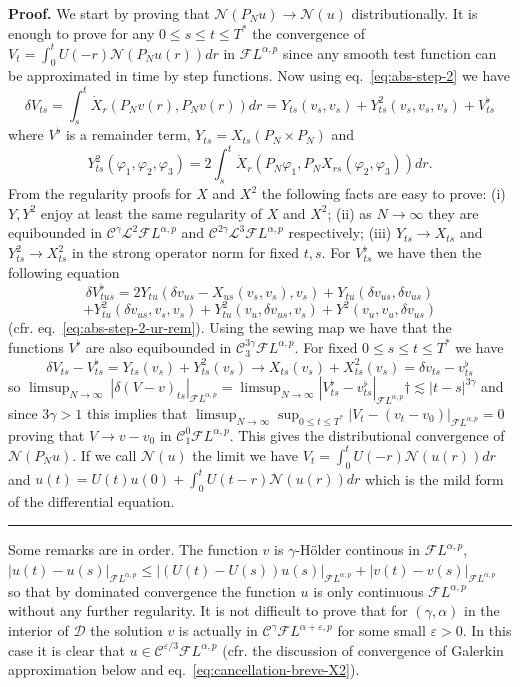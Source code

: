\documentclass[a4paper,11pt,reqno]{article}
\newcommand{\eps}{\varepsilon}
\newcommand{\der}{\delta}
\newcommand{\CC}{\mathcal{C}}
\newcommand{\DD}{\mathcal{D}}
\newcommand{\FF}{\mathcal{F}}
\newcommand{\LL}{\mathcal{L}}
\newenvironment{proof}[1][Proof]{\textbf{#1.} }{\ \rule{0.5em}{0.5em}}
\begin{document}
\begin{proof}
We start by proving that $\mathcal{N}(P_N u) \to \mathcal{N}(u)$ distributionally. It is enough to prove for any $0\le s \le t \le T^*$ the convergence of 
$
V_{t}=\int_0^t  U(-r)\mathcal{N}(P_N u(r)) dr 
$
in $\FF L^{\alpha,p}$ since any smooth test function can be approximated in time by step functions. Now using eq.~\eqref{eq:abs-step-2} we have
\begin{equation}
\label{eq:weak-conv-decomp}
\der V_{ts}=
\int_s^t \dot X_r(P_N v(r),P_N v(r)) dr
=Y_{ts}(v_s,v_s)+Y^2_{ts}(v_s,v_s,v_s) + V^\flat_{ts}
\end{equation}
where $V^\flat$ is a remainder term, $Y_{ts} = X_{ts}(P_N \times P_N)$ and
$$
Y^2_{ts}(\varphi_1,\varphi_2,\varphi_3) = 2 \int_s^t \dot X_r(P_N \varphi_1,P_N X_{rs}(\varphi_2,\varphi_3)) dr .
$$
From the regularity proofs for $X$ and $X^2$ the following facts are easy to prove:
 (i)
 $Y, Y^2$ enjoy at least the same regularity of $X$ and $ X^2$; (ii)
as $N\to \infty$ they are equibounded in $\CC^\gamma \LL^2 \FF L^{\alpha,p}$ and $\CC^{2\gamma} \LL^3 \FF L^{\alpha,p}$ respectively; (iii) $Y_{ts}\to X_{ts}$ and $ Y^2_{ts}\to  X_{ts}^2$ in the strong operator norm for fixed $t,s$.
For $V^\flat_{ts}$ we have then the following equation
$$
\der V^\flat_{tus} = 2 Y_{tu}(\der v_{us}-X_{us}(v_s,v_s),v_s)+Y_{tu}(\der v_{us},\der v_{us})
$$
$$
+  Y^2_{tu}(\der v_{us},v_s,v_s)+ Y^2_{tu}(v_u,\der v_{us},v_s) +  Y^2(v_u,v_u,\der v_{us})
$$
(cfr. eq.~\eqref{eq:abs-step-2-ur-rem}).
  Using the sewing map we have that the functions $V^\flat$ are also equibounded in $\CC_3^{3\gamma}\FF L^{\alpha,p}$. For fixed $0\le s\le t \le T^*$ we have
$$
\der V_{ts}-V^\flat_{ts} = Y_{ts}(v_s)+ Y^2_{ts}(v_s) \to 
X_{ts}(v_s)+ X^2_{ts}(v_s) = \der v_{ts}-v^\flat_{ts}
$$
so $\limsup_{N\to \infty}\ |\der(V-v)_{ts} |_{\FF L^{\alpha,p}} = \limsup_{N\to \infty} | V^\flat_{ts}-v^\flat_{ts}|_{\FF L^{\alpha,p}}†\lesssim |t-s|^{3\gamma} 
$
and since $3\gamma > 1$ this implies that $\limsup_{N\to \infty} \sup_{0\le t\le T^*} |V_t-(v_t-v_0)|_{\FF L^{\alpha,p}} = 0$ proving that $V \to v-v_0$ in $\CC^0_1 \FF L^{\alpha,p}$. This gives the distributional convergence of $\mathcal{N}(P_N u)$. If we call $\mathcal{N}(u)$ the limit we have $V_t = \int_0^t U(-r)\mathcal{N}(u(r)) dr$ and
$
u(t) = U(t)u(0) + \int_0^t U(t-r)\mathcal{N}(u(r)) dr
$
which is the mild form of the differential equation.
\end{proof}

\medskip

Some remarks are in order. The function $v$ is $\gamma$-H\"older continous in $\FF L^{\alpha,p}$,  $|u(t)-u(s)|_{\FF L^{\alpha,p}} \le |(U(t)-U(s))u(s)|_{\FF L^{\alpha,p}} + |v(t)-v(s)|_{\FF L^{\alpha,p}}$ so that by dominated convergence  the function $u$ is only continuous $\FF L^{\alpha,p}$ without any further regularity. It is not difficult to prove that for $(\gamma,\alpha)$ in the interior of $\DD$ the solution $v$ is actually in $\CC^\gamma \FF L^{\alpha+\eps,p}$ for some small $\eps >0$. In this case it is clear that $u\in \CC^{\eps/3} \FF L^{\alpha,p}$ (cfr. the discussion of convergence of Galerkin approximation below and eq.~\eqref{eq:cancellation-breve-X2}).
\end{document}
